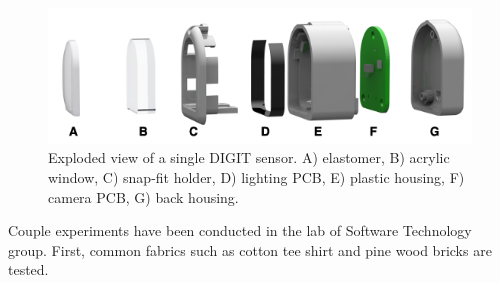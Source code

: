 \begin{figure}[t]
	\centering
	\includegraphics[width=1\textwidth]{fig/digit_components.png}
	\caption{Exploded view of a single DIGIT sensor. A) elastomer, B) acrylic window, C) snap-fit holder, D) lighting PCB, E) plastic housing, F) camera PCB, G) back housing.}
	\label{fig:digit} %
\end{figure}

Couple experiments have been conducted in the lab of Software Technology group. First, common fabrics such as cotton tee shirt and pine wood bricks are tested.

